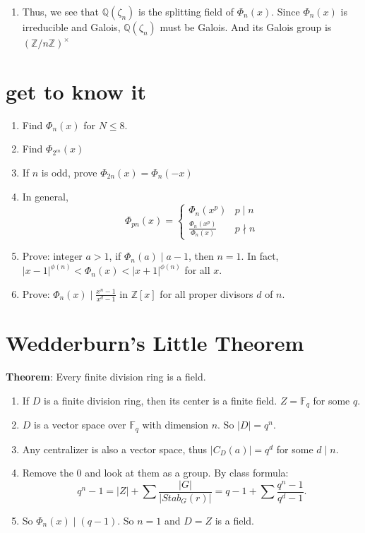 \documentclass[20pt]{scrartcl}
\newcommand{\Q}{\mathbb{Q}}
\newcommand{\Z}{\mathbb{Z}}
\newcommand{\F}{\mathbb{F}}
\begin{document}
\begin{enumerate}
\begin{proof}
    \textbf{Case 2}: For any root $\zeta_n^m$ of $f(x)$ and any $p\nmid n$, $\zeta_n^{mp}$ is also a root of $f(x)$. 
    In this case, we claim that $f(x)=\Phi_n(x)$. Indeed: if for any $t$ that is coprime to $n$, there exists $k$ coprime to $n$ such taht $t\equiv mk\pmod n$. (both $t$ and $m$ have inverse)
    \\
    Therefore, $\zeta_n^t=\zeta_n{mk}=\zeta{mp_1p_2\cdot p_i}$ where $p_1$ to $p_i$ are all coprime to $n$. Thus, $\zeta_n^t$ is a roof of $f(x)$. 
    
    \end{proof}
    \item Thus, we see that $\Q(\zeta_n)$ is the splitting field of $\Phi_n(x)$. Since $\Phi_n(x)$ is irreducible and Galois, $\Q(\zeta_n)$ must be Galois. And its Galois group is $(\Z/n\Z)^\times$
\end{enumerate}
\section{get to know it}
    \begin{enumerate}
        \item Find $\Phi_n(x)$ for $N\leq 8$.
        \item Find $\Phi_{2^m}(x)$
        \item If $n$ is odd, prove $\Phi_{2n}(x)=\Phi_n(-x)$
        \item In general, 
        \[\Phi_{pn}(x)=\begin{cases}
        \Phi_n(x^p) & p\mid n\\
        \frac{\Phi_n(x^p)}{\Phi_n(x)} & p\nmid n
        \end{cases}\]
        \item Prove: integer $a>1$, if $\Phi_n(a)\mid a-1$, then $n=1$. In fact, $|x-1|^{\phi(n)}<\Phi_n(x)<|x+1|^{\phi(n)}$ for all $x$. 
        \item Prove: $\Phi_n(x)\mid \frac{x^n-1}{x^d-1}$ in $\Z[x]$ for all proper divisors $d$ of $n$.
    \end{enumerate}
\section{Wedderburn's Little Theorem}
\textbf{Theorem}: Every finite division ring is a field.
\begin{enumerate}
    \item If $D$ is a finite division ring, then its center is a finite field. $Z=\F_q$ for some $q$.
    \item $D$ is a vector space over $\F_q$ with dimension $n$. So $|D|=q^n$.
    \item Any centralizer is also a vector space, thus $|C_D(a)|=q^d$ for some $d\mid n$.
    \item Remove the $0$ and look at them as a group. By class formula:
    \[q^n-1=|Z|+\sum \frac{|G|}{|Stab_G(r)|}=q-1+\sum \frac{q^n-1}{q^d-1}.\]
    \item So $\Phi_n(x)\mid (q-1)$. So $n=1$ and $D=Z$ is a field. 
\end{enumerate}
\end{document}
